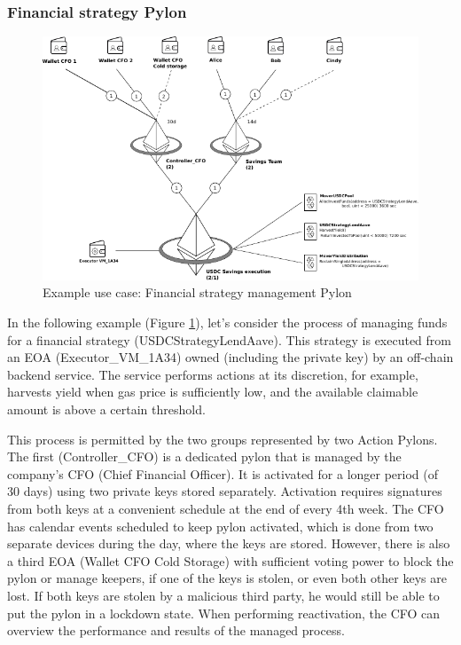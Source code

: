 \documentclass[12pt]{article}
\begin{document}
\pagebreak
\subsubsection{Financial strategy Pylon}
\label{example_fin_strategy_pylon}

\begin{figure}[h]
  \hspace*{-1cm}
    \includegraphics[width=1.25\textwidth]{pylon_example_strategy_management.pdf}
    \caption[Figure 1]{Example use case: Financial strategy management Pylon\label{fig:pylon_example_strategy_mgmt}}
\end{figure}

In the following example (Figure \ref{fig:pylon_example_strategy_mgmt}), let’s consider the process of managing funds for a financial strategy (USDCStrategyLendAave). This strategy is executed from an EOA (Executor\_VM\_1A34) owned (including the private key) by an off-chain backend service. The service performs actions at its discretion, for example, harvests yield when gas price is sufficiently low, and the available claimable amount is above a certain threshold.

This process is permitted by the two groups represented by two Action Pylons. The first (Controller\_CFO) is a dedicated pylon that is managed by the company’s CFO (Chief Financial Officer). It is activated for a longer period (of 30 days) using two private keys stored separately. Activation requires signatures from both keys at a convenient schedule at the end of every 4th week. The CFO has calendar events scheduled to keep pylon activated, which is done from two separate devices during the day, where the keys are stored. However, there is also a third EOA (Wallet CFO Cold Storage) with sufficient voting power to block the pylon or manage keepers, if one of the keys is stolen, or even both other keys are lost. If both keys are stolen by a malicious third party, he would still be able to put the pylon in a lockdown state. When performing reactivation, the CFO can overview the performance and results of the managed process.
\end{document}
